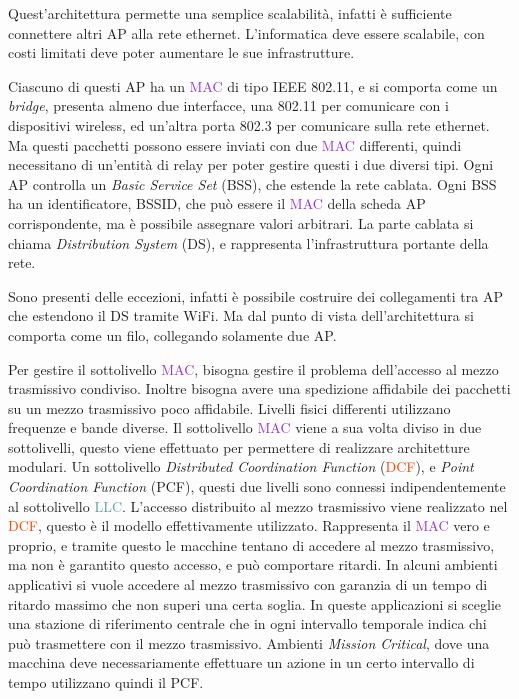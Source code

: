 \documentclass{article}
\numberwithin{equation}{subsection}
\begin{document}
Quest'architettura permette una semplice scalabilità, infatti è sufficiente connettere altri \textcolor{PineGreen}{AP} alla rete ethernet. 
L'informatica deve essere scalabile, con costi limitati deve poter aumentare le sue infrastrutture.  


Ciascuno di questi \textcolor{PineGreen}{AP} ha un \textcolor{DarkOrchid}{MAC} di tipo IEEE 802.11, e si comporta come un \textit{bridge}, presenta almeno due interfacce, una 802.11 per comunicare con i dispositivi wireless, 
ed un'altra porta 802.3 per comunicare sulla rete ethernet. Ma questi pacchetti possono essere inviati con due \textcolor{DarkOrchid}{MAC} differenti, quindi necessitano di un'entità di relay per poter 
gestire questi i due diversi tipi. Ogni \textcolor{PineGreen}{AP} controlla un \textit{Basic Service Set} (\textcolor{Rhodamine}{BSS}), che estende la rete cablata. Ogni \textcolor{Rhodamine}{BSS} ha un identificatore, \textcolor{Rhodamine}{BSSID}, che può essere il \textcolor{DarkOrchid}{MAC} della scheda \textcolor{PineGreen}{AP} corrispondente, ma è possibile assegnare valori arbitrari. 
La parte cablata si chiama \textit{Distribution System} (\textcolor{RawSienna}{DS}), e rappresenta l'infrastruttura portante della rete. 

Sono presenti delle eccezioni, infatti è possibile costruire dei collegamenti tra \textcolor{PineGreen}{AP} che estendono il \textcolor{RawSienna}{DS} tramite \textcolor{Sepia}{WiFi}. Ma dal punto di vista dell'architettura si comporta 
come un filo, collegando solamente due \textcolor{PineGreen}{AP}. 


Per gestire il sottolivello \textcolor{DarkOrchid}{MAC}, bisogna gestire il problema dell'accesso al mezzo trasmissivo condiviso. Inoltre bisogna avere una spedizione affidabile dei pacchetti 
su un mezzo trasmissivo poco affidabile. 
Livelli fisici differenti utilizzano frequenze e bande diverse. Il sottolivello \textcolor{DarkOrchid}{MAC} viene a sua volta diviso in due sottolivelli, questo viene effettuato per permettere 
di realizzare architetture modulari. 
Un sottolivello \textit{Distributed Coordination Function} (\textcolor{OrangeRed}{DCF}), e \textit{Point Coordination Function} (PCF), questi due livelli sono connessi indipendentemente al sottolivello \textcolor{CadetBlue}{LLC}. 
L'accesso distribuito al mezzo trasmissivo viene realizzato nel \textcolor{OrangeRed}{DCF}, questo è il modello effettivamente utilizzato. Rappresenta il \textcolor{DarkOrchid}{MAC} vero e proprio, e tramite questo 
le macchine tentano di accedere al mezzo trasmissivo, ma non è garantito questo accesso, e può comportare ritardi. 
In alcuni ambienti applicativi si vuole accedere al mezzo trasmissivo con garanzia di un tempo di ritardo massimo che non superi una certa soglia. In queste 
applicazioni si sceglie una stazione di riferimento centrale che in ogni intervallo temporale indica chi può trasmettere con il mezzo trasmissivo. Ambienti \textit{Mission Critical}, 
dove una macchina deve necessariamente effettuare un azione in un certo intervallo di tempo utilizzano quindi il PCF.  
\end{document}
